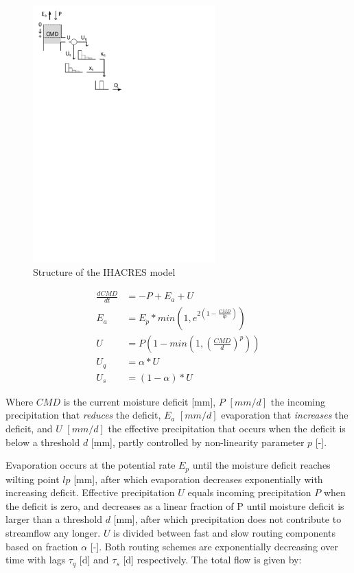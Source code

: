 { 																	%
\begin{figure}
\includegraphics[trim=1cm 20cm 7cm 1cm,width=7cm,keepaspectratio]{./files/05_schematic.pdf}
\caption{Structure of the IHACRES model} \label{fig:05_schematic}
\end{figure}

\begin{align}
	\frac{dCMD}{dt} &= -P+E_a+U \\
	E_a &= E_p *min\left(1,e^{2\left(1-\frac{CMD}{lp}\right)}\right) \\
	U &= P\left(1-min\left(1,\left(\frac{CMD}{d}\right)^p\right)\right) \\
	U_q &= \alpha *U\\
	U_s &= (1-\alpha)*U
\end{align}

Where $CMD$ is the current moisture deficit [mm], $P$ $[mm/d]$ the incoming precipitation that \emph{reduces} the deficit, $E_a$ $[mm/d]$ evaporation that \emph{increases} the deficit, and $U$ $[mm/d]$ the effective precipitation that occurs when the deficit is below a threshold $d$ [mm], partly controlled by non-linearity parameter $p$ [-].

}

Evaporation occurs at the potential rate $E_p$ until the moisture deficit reaches wilting point $lp$ [mm], after which evaporation decreases exponentially with increasing deficit. Effective precipitation $U$ equals incoming precipitation $P$ when the deficit is zero, and decreases as a linear fraction of P until moisture deficit is larger than a threshold $d$ [mm], after which precipitation does not contribute to streamflow any longer. $U$ is divided between fast and slow routing components based on fraction $\alpha$ [-]. Both routing schemes are exponentially decreasing over time with lags $\tau_q$ [d] and $\tau_s$ [d] respectively. The total flow is given by:

